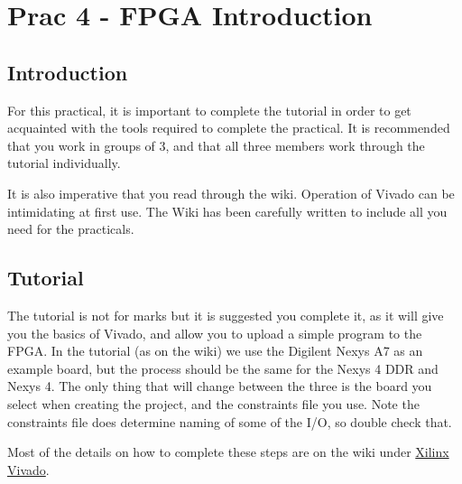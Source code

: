 \section{Prac 4 - FPGA Introduction}
\label{sec:Prac4}
\subsection{Introduction}
For this practical, it is important to complete the tutorial in order to get acquainted with the tools required to complete the practical. It is recommended that you work in groups of 3, and that all three members work through the tutorial individually.

It is also imperative that you read through the wiki. Operation of Vivado can be intimidating at first use. The Wiki has been carefully written to include all you need for the practicals. 

\subsection{Tutorial}
The tutorial is not for marks but it is suggested you complete it, as it will give you the basics of Vivado, and allow you to upload a simple program to the FPGA. In the tutorial (as on the wiki) we use the Digilent Nexys A7 as an example board, but the process should be the same for the Nexys 4 DDR and Nexys 4. The only thing that will change between the three is the board you select when creating the project, and the constraints file you use. Note the constraints file does determine naming of some of the I/O, so double check that.

Most of the details on how to complete these steps are on the wiki under \href{http://wiki.ee.uct.ac.za/Xilinx_Vivado}{Xilinx Vivado}.

